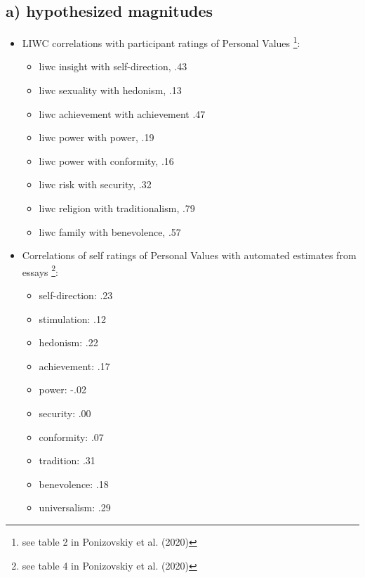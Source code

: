 \documentclass[
  letterpaper,
  DIV=11,
  numbers=noendperiod]{scrartcl}
\providecommand{\tightlist}{%
  \setlength{\itemsep}{0pt}\setlength{\parskip}{0pt}}\usepackage{longtable,booktabs,array}
\begin{document}
\hypertarget{sec-magnitudes}{%
\subsection{a) hypothesized magnitudes}\label{sec-magnitudes}}

\begin{itemize}
\item
  LIWC correlations with participant ratings of Personal Values
  \footnote{see table 2 in Ponizovskiy et al. (2020)}:

  \begin{itemize}
  \tightlist
  \item
    liwc insight with self-direction, .43
  \item
    liwc sexuality with hedonism, .13
  \item
    liwc achievement with achievement .47
  \item
    liwc power with power, .19
  \item
    liwc power with conformity, .16
  \item
    liwc risk with security, .32
  \item
    liwc religion with traditionalism, .79
  \item
    liwc family with benevolence, .57
  \end{itemize}
\end{itemize}

\begin{itemize}
\item
  Correlations of self ratings of Personal Values with automated
  estimates from essays \footnote{see table 4 in Ponizovskiy et al.
    (2020)}:

  \begin{itemize}
  \tightlist
  \item
    self-direction: .23
  \item
    stimulation: .12
  \item
    hedonism: .22
  \item
    achievement: .17
  \item
    power: -.02
  \item
    security: .00
  \item
    conformity: .07
  \item
    tradition: .31
  \item
    benevolence: .18
  \item
    universalism: .29
  \end{itemize}
\end{itemize}
\end{document}

